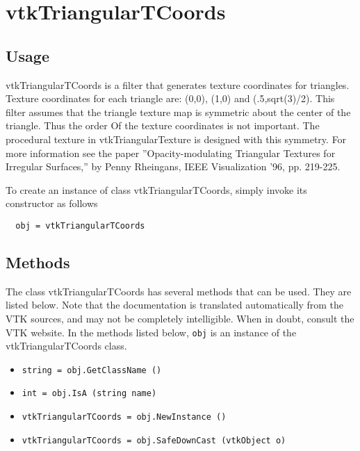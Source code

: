 \section{vtkTriangularTCoords}

\subsection{Usage}

 vtkTriangularTCoords is a filter that generates texture coordinates
 for triangles. Texture coordinates for each triangle are:
 (0,0), (1,0) and (.5,sqrt(3)/2). This filter assumes that the triangle
 texture map is symmetric about the center of the triangle. Thus the order
 Of the texture coordinates is not important. The procedural texture
 in vtkTriangularTexture is designed with this symmetry. For more information
 see the paper ''Opacity-modulating Triangular Textures for Irregular 
 Surfaces,''  by Penny Rheingans, IEEE Visualization '96, pp. 219-225.

To create an instance of class vtkTriangularTCoords, simply
invoke its constructor as follows
\begin{verbatim}
  obj = vtkTriangularTCoords
\end{verbatim}
\subsection{Methods}

The class vtkTriangularTCoords has several methods that can be used.
  They are listed below.
Note that the documentation is translated automatically from the VTK sources,
and may not be completely intelligible.  When in doubt, consult the VTK website.
In the methods listed below, \verb|obj| is an instance of the vtkTriangularTCoords class.
\begin{itemize}
\item  \verb|string = obj.GetClassName ()|

\item  \verb|int = obj.IsA (string name)|

\item  \verb|vtkTriangularTCoords = obj.NewInstance ()|

\item  \verb|vtkTriangularTCoords = obj.SafeDownCast (vtkObject o)|

\end{itemize}
